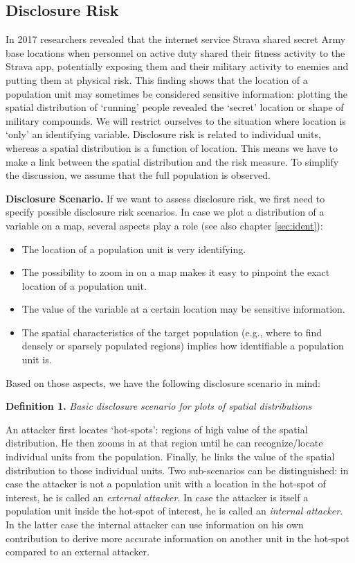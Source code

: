 \subsection{Disclosure Risk}

In 2017 researchers revealed that the internet service Strava shared secret Army base locations when 
personnel on active duty shared their fitness activity to the Strava app, potentially 
exposing them and their military activity to enemies and putting them at physical 
risk. 
This finding shows that the location of
a population unit may sometimes be considered sensitive information: plotting
the spatial distribution of ‘running’ people revealed the ‘secret’ location or shape
of military compounds. We will restrict ourselves to the situation where location is 
‘only’ an identifying variable.
Disclosure risk is related to individual units, whereas a spatial distribution
is a function of location. This means we have to make a link between the spatial
distribution and the risk measure. To simplify the discussion, we assume that
the full population is observed.\bigskip

\textbf{Disclosure Scenario.} If we want to assess disclosure risk, we first need to
specify possible disclosure risk scenarios. In case we plot a distribution of a
variable on a map, several aspects play a role (see also chapter \ref{sec:ident}):

\begin{itemize}
\item The location of a population unit is very identifying.
\item The possibility to zoom in on a map makes it easy to pinpoint the exact
location of a population unit.
\item The value of the variable at a certain location may be sensitive information.
\item The spatial characteristics of the target population (e.g., where to find densely
or sparsely populated regions) implies how identifiable a population unit is.
\end{itemize}

Based on those aspects, we have the following disclosure scenario in mind:\bigskip

\textbf{Definition 1.} \textit{Basic disclosure scenario for plots of spatial distributions}

An attacker first locates ‘hot-spots’: regions of high value of the spatial distribution. He then zooms in at that region until he can recognize/locate individual
units from the population. Finally, he links the value of the spatial distribution
to those individual units.
Two sub-scenarios can be distinguished: in case the attacker is not a population unit with a location in the hot-spot of interest, he is called an \emph{external
attacker}. In case the attacker is itself a population unit inside the hot-spot of interest,
he is called an \emph{internal attacker}. In the latter case the internal attacker can
use information on his own contribution to derive more accurate information on
another unit in the hot-spot compared to an external attacker.\bigskip

